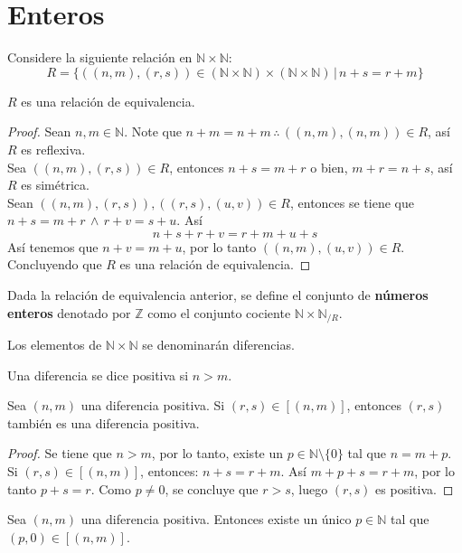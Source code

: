 \section{Enteros}
Considere la siguiente relación en $\mathbb{N} \times \mathbb{N}$:
\[
  R = \{((n,m),(r,s))\in (\mathbb{N} \times \mathbb{N}) \times (
  \mathbb{N} \times \mathbb{N}) \, | \, n +s = r + m \}
\]
\begin{lemma}\label{lemma:1}
  $R$ es una relación de equivalencia.
\end{lemma}
\begin{proof}
  Sean $n,m \in \mathbb{N}$. Note que $n+m = n + m \, \therefore \,
  ((n,m),(n,m))\in R$, así $R$ es reflexiva. \\
  Sea $((n,m),(r,s)) \in R$, entonces $n+s = m + r$ o bien, $ m + r = n+ s$,
  así $R$ es simétrica. \\
  Sean $((n,m),(r,s)), ((r,s),(u,v)) \in R$, entonces se tiene que $n + s = m
  + r \, \land \, r + v = s + u$. Así 
  \[
    n + s + r + v = r + m + u + s
  \]
  Así tenemos que $ n + v = m + u$, por lo tanto $((n,m), (u,v)) \in R$.
  Concluyendo que $R$ es una relación de equivalencia.
\end{proof}
\begin{definition} Dada la relación de equivalencia anterior, se define el
  conjunto de \textbf{números enteros} denotado por $\mathbb{Z}$ como el
  conjunto cociente $\mathbb{N}\times\mathbb{N}_{/R}$.
\end{definition}
Los elementos de $\mathbb{N}\times\mathbb{N}$ se denominarán diferencias.
\begin{definition}
  Una diferencia se dice positiva si $n > m$.
\end{definition}
\begin{lemma}\label{lemma:2}
  Sea $(n,m)$ una diferencia positiva. Si $(r,s) \in [(n,m)]$, entonces
  $(r,s)$ también es una diferencia positiva.
\end{lemma}
\begin{proof}
  Se tiene que $n > m$, por lo tanto, existe un $p \in
  \mathbb{N}\setminus\{0\}$ tal que $n = m+p$. Si $(r, s) \in [(n,m)] $,
  entonces: $n + s = r + m$. Así $m + p + s = r + m$, por lo tanto $p + s =
  r$. Como $p \neq 0$, se concluye que $r>s$, luego $(r,s)$ es positiva.
\end{proof}
\begin{lemma}\label{lemma:3} 
  Sea $(n,m)$ una diferencia positiva. Entonces existe un único $p \in
  \mathbb{N}$ tal que $(p,0) \in [(n,m)]$.
\end{lemma}
